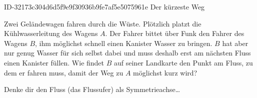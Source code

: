 \begin{exercise}
      {ID-32173c304d6d5f9e9f30936b9fe7af5e5075961e}
      {Der kürzeste Weg}
  \ifproblem\problem\par
    Zwei Geländewagen fahren durch die Wüste. Plötzlich platzt die
    Kühlwasserleitung des Wagens $A$. Der Fahrer bittet über Funk den Fahrer des
    Wagens $B$, ihm möglichst schnell einen Kanister Wasser zu bringen.
    $B$ hat aber nur genug Wasser für sich selbst dabei und muss deshalb erst
    am nächsten Fluss einen Kanister füllen. Wie findet $B$ auf seiner Landkarte
    den Punkt am Fluss, zu dem er fahren muss, damit der Weg zu $A$ möglichst kurz
    wird?
    \begin{center}
    \end{center}
  \fi
  \ifoutline\outline\par
    Denke dir den Fluss (das Flussufer) als Symmetrieachse\ldots
  \fi
\end{exercise}
